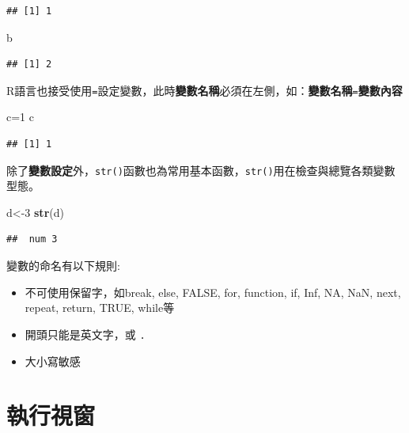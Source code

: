 \documentclass[]{book}
\newenvironment{Shaded}{\begin{snugshade}}{\end{snugshade}}
\newcommand{\KeywordTok}[1]{\textcolor[rgb]{0.13,0.29,0.53}{\textbf{{#1}}}}
\newcommand{\DecValTok}[1]{\textcolor[rgb]{0.00,0.00,0.81}{{#1}}}
\newcommand{\NormalTok}[1]{{#1}}
\providecommand{\tightlist}{%
  \setlength{\itemsep}{0pt}\setlength{\parskip}{0pt}}
\theoremstyle{definition}
\theoremstyle{definition}
\theoremstyle{remark}
\begin{document}
\begin{verbatim}
## [1] 1
\end{verbatim}

\begin{Shaded}
\begin{Highlighting}[]
\NormalTok{b}
\end{Highlighting}
\end{Shaded}

\begin{verbatim}
## [1] 2
\end{verbatim}

R語言也接受使用\texttt{=}設定變數，此時\textbf{變數名稱}必須在左側，如：\textbf{變數名稱}\texttt{=}\textbf{變數內容}

\begin{Shaded}
\begin{Highlighting}[]
\NormalTok{c=}\DecValTok{1} 
\NormalTok{c}
\end{Highlighting}
\end{Shaded}

\begin{verbatim}
## [1] 1
\end{verbatim}

除了\textbf{變數設定}外，\texttt{str()}函數也為常用基本函數，\texttt{str()}用在檢查與總覽各類變數型態。

\begin{Shaded}
\begin{Highlighting}[]
\NormalTok{d<-}\DecValTok{3}
\KeywordTok{str}\NormalTok{(d)}
\end{Highlighting}
\end{Shaded}

\begin{verbatim}
##  num 3
\end{verbatim}

變數的命名有以下規則:

\begin{itemize}
\tightlist
\item
  不可使用保留字，如break, else, FALSE, for, function, if, Inf, NA, NaN,
  next, repeat, return, TRUE, while等
\item
  開頭只能是英文字，或 \texttt{.}
\item
  大小寫敏感
\end{itemize}

\section{執行視窗}
\end{document}
